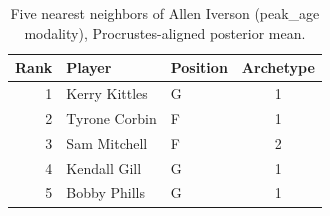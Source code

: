 \begin{table}[htbp]
  \centering\small
  \begin{tabular}{rllc}
    \toprule
    Rank & Player & Position & Archetype \\
    \midrule
    1 & Kerry Kittles & G & 1 \\
    2 & Tyrone Corbin & F & 1 \\
    3 & Sam Mitchell & F & 2 \\
    4 & Kendall Gill & G & 1 \\
    5 & Bobby Phills & G & 1 \\
    \bottomrule
  \end{tabular}
  \caption{Five nearest neighbors of Allen Iverson (peak_age modality), Procrustes-aligned posterior mean.}
  \label{tab:Allen_Iverson_neighbors_peak_age}
\end{table}

